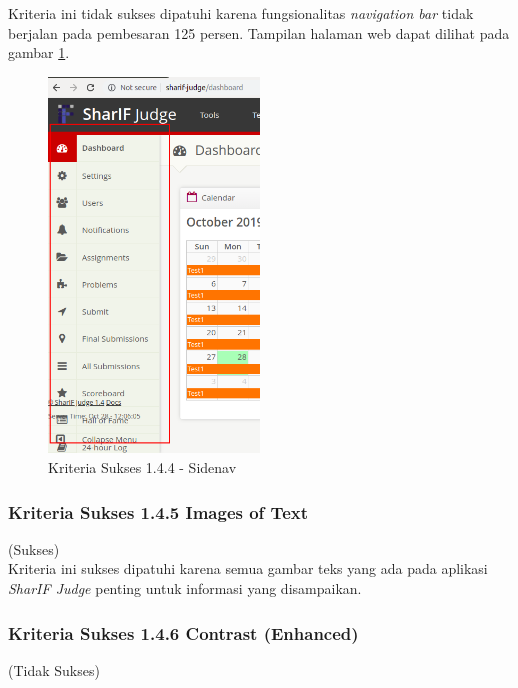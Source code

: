 \documentclass[a4paper,twoside]{article}
\begin{document}
\begin{enumerate}
		Kriteria ini tidak sukses dipatuhi karena fungsionalitas \textit{navigation bar} tidak berjalan pada pembesaran 125 persen. Tampilan halaman web dapat dilihat pada gambar \ref{fig:kepatuhan_1_4_4_nav_bar}.
		\begin{figure}[H]
			\centering  
			\includegraphics[width=0.5\textwidth]{kepatuhan_1_4_4_nav_bar}  
			\caption[Kriteria Sukses 1.4.4 - Sidenav]{Kriteria Sukses 1.4.4 - Sidenav} 
			\label{fig:kepatuhan_1_4_4_nav_bar} 
		\end{figure}
		
		
		\subsubsection*{Kriteria Sukses 1.4.5 Images of Text}
		\label{subsubsec:kepatuhan_kriteria_1.4.5}
		(Sukses) \\
		
		Kriteria ini sukses dipatuhi karena semua gambar teks yang ada pada aplikasi \textit{SharIF Judge} penting untuk informasi yang disampaikan.
		
		\subsubsection{Kriteria Sukses 1.4.6 Contrast (Enhanced)}
		\label{subsubsec:kepatuhan_kriteria_1.4.6}
		
		(Tidak Sukses) \\
		

\end{enumerate}
\end{document}
